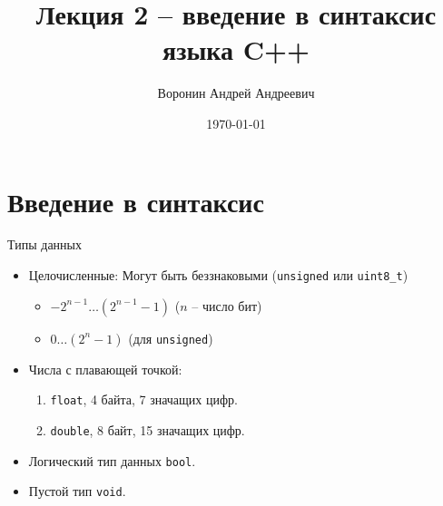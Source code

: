 \documentclass[
    9pt,
    hyperref={pdfencoding=unicode}
    ]{beamer}
\author{Воронин Андрей Андреевич}
\title{Лекция 2 – введение в синтаксис языка C++}
\institute{Кафедра прикладной математики и информатики}
\date{\today}
\begin{document}
\titlepage 

\section{Введение в синтаксис}
\begin{frame}{Типы данных}
    \begin{itemize}
        \item<1-> Целочисленные:
        Могут быть беззнаковыми (\texttt{unsigned} или \texttt{uint8_t})
        \begin{itemize}
            \item $ -2^{n-1} \ldots (2^{n-1}-1) $ ($n$ -- число бит)
            \item $ 0 \ldots (2^{n}-1) $ (для \texttt{unsigned})
        \end{itemize}
        \item Числа с плавающей точкой:
        \begin{enumerate}
            \item \texttt{float}, 4 байта, 7 значащих цифр.
            \item \texttt{double}, 8 байт, 15 значащих цифр.
        \end{enumerate}
        \item Логический тип данных \texttt{bool}.
        \item Пустой тип \texttt{void}.        
    \end{itemize}
\end{frame}
\end{document}

